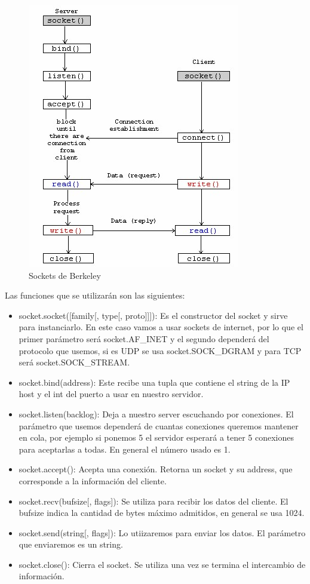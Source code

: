 \documentclass[onecolumn,11pts]{IEEEtran}
\begin{document}
   \begin{figure}[h!]
\centering
 \includegraphics[scale=0.7]{image007}
\caption{Sockets de Berkeley}
\label{fig:image007}
\end{figure}
\newpage
    Las funciones que se utilizarán son las siguientes: 
    \begin{itemize}
    \item socket.socket([family[, type[, proto]]]): Es el constructor del socket y sirve para instanciarlo. En este caso vamos a usar sockets de internet, por lo que el primer parámetro será socket.AF\_INET y el segundo dependerá del protocolo que usemos, si es UDP se usa socket.SOCK\_DGRAM y para TCP será socket.SOCK\_STREAM.
    \item socket.bind(address): Este recibe una tupla que contiene el string de la IP host y el int del puerto a usar en nuestro servidor.
    \item socket.listen(backlog): Deja a nuestro server escuchando por conexiones. El parámetro que usemos dependerá de cuantas conexiones queremos mantener en cola, por ejemplo si ponemos 5 el servidor esperará a tener 5 conexiones para aceptarlas a todas. En general el número usado es 1.
    \item socket.accept(): Acepta una conexión. Retorna un socket y su address, que corresponde a la información del cliente.
    \item socket.recv(bufsize[, flags]): Se utiliza para recibir los datos del cliente. El bufsize indica la cantidad de bytes máximo admitidos, en general se usa 1024.
    \item socket.send(string[, flags]): Lo utiizaremos para enviar los datos. El parámetro que enviaremos es un string.
    \item socket.close(): Cierra el socket. Se utiliza una vez se termina el intercambio de información.\\
\end{itemize}
\end{document}
